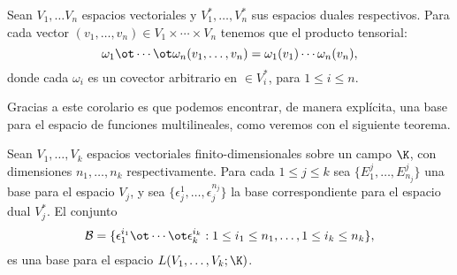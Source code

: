 \begin{corollary}
	Sean $V_1, \ldots V_n$ espacios vectoriales y $V_1^{*}, \ldots, V_{n}^{*}$
	sus espacios duales respectivos. Para cada vector $(v_1, \ldots, v_n) \in V_1
		\times \cdots \times V_n$ tenemos que el producto tensorial:
	\[
		\omega_1 \ot \cdots \ot \omega_n (v_1, \ldots, v_n)
		=
		\omega_1(v_1)\cdots \omega_n(v_n),
	\]
	donde cada $\omega_i$ es un covector arbitrario en $\in V_i^{*}$, para
	$1 \leq i \leq n$.
\end{corollary}

Gracias a este corolario es que podemos encontrar, de manera explícita, una
base para el espacio de funciones multilineales, como veremos con el siguiente
teorema.

\begin{theorem}
	\label{Teorema: Base para el espacio de funciones multilineales}
	Sean $V_1, \ldots, V_k$ espacios vectoriales finito-dimensionales sobre un
	campo $\K$, con dimensiones $n_1, \ldots, n_k$ respectivamente. Para
	cada $1 \leq j \leq k$ sea $\{E_{1}^{j}, \ldots, E_{n_j}^{j} \}$ una base para el
	espacio $V_j$, y sea $\{\epsilon_{j}^{1}, \ldots, \epsilon_{j}^{n_j}\}$ la
	base correspondiente para el espacio dual $V_j^{*}$. El conjunto
	\[
		\mathcal{B} = \{\epsilon_{1}^{i_1} \ot \cdots \ot \epsilon_{k}^{i_k}
		: 1 \leq i_1 \leq n_1, \ldots, 1 \leq i_k \leq n_k\},
	\]
	es una base para el espacio $L(V_1,\ldots,V_k;\K)$.
\end{theorem}

